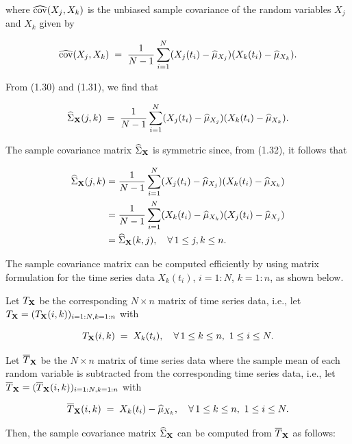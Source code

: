 where $\widehat{\operatorname{cov}}(X_j,X_k)$ is the unbiased sample covariance of the
random variables $X_j$ and $X_k$ given by

\begin{equation}
\widehat{\operatorname{cov}}(X_j,X_k) \;=\; \frac{1}{N-1}\sum_{i=1}^N
(X_j(t_i)-\widehat{\mu}_{X_j})(X_k(t_i)-\widehat{\mu}_{X_k}).
\end{equation}

From (1.30) and (1.31), we find that

\begin{equation}
\widehat{\Sigma}_{\mathbf{X}}(j,k) \;=\; \frac{1}{N-1}\sum_{i=1}^N
(X_j(t_i)-\widehat{\mu}_{X_j})(X_k(t_i)-\widehat{\mu}_{X_k}).
\end{equation}

The sample covariance matrix $\widehat{\Sigma}_{\mathbf{X}}$ is symmetric since,
from (1.32), it follows that

\begin{align*}
\widehat{\Sigma}_{\mathbf{X}}(j,k)
&= \frac{1}{N-1}\sum_{i=1}^N (X_j(t_i)-\widehat{\mu}_{X_j})(X_k(t_i)-\widehat{\mu}_{X_k}) \\
&= \frac{1}{N-1}\sum_{i=1}^N (X_k(t_i)-\widehat{\mu}_{X_k})(X_j(t_i)-\widehat{\mu}_{X_j}) \\
&= \widehat{\Sigma}_{\mathbf{X}}(k,j), \quad \forall\, 1\le j,k\le n.
\end{align*}

The sample covariance matrix can be computed efficiently by using matrix
formulation for the time series data $X_k(t_i)$, $i=1:N$, $k=1:n$, as shown
below.

Let $T_{\mathbf{X}}$ be the corresponding $N\times n$ matrix of time series
data, i.e., let $T_{\mathbf{X}}=(T_{\mathbf{X}}(i,k))_{i=1:N,k=1:n}$ with

\begin{equation}
T_{\mathbf{X}}(i,k) \;=\; X_k(t_i), \quad \forall\, 1\le k\le n,\ 1\le i\le N.
\end{equation}

Let $\overline{T}_{\mathbf{X}}$ be the $N\times n$ matrix of time series data where
the sample mean of each random variable is subtracted from the
corresponding time series data, i.e., let $\overline{T}_{\mathbf{X}} =
(\overline{T}_{\mathbf{X}}(i,k))_{i=1:N,k=1:n}$ with

\begin{equation}
\overline{T}_{\mathbf{X}}(i,k) \;=\; X_k(t_i) - \widehat{\mu}_{X_k}, \quad
\forall\, 1\le k\le n,\ 1\le i\le N.
\end{equation}

Then, the sample covariance matrix $\widehat{\Sigma}_{\mathbf{X}}$ can be computed
from $\overline{T}_{\mathbf{X}}$ as follows:

